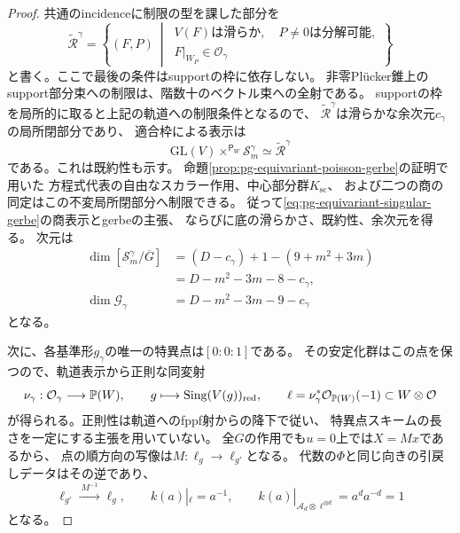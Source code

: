 \begin{proof}
共通のincidenceに制限の型を課した部分を
\begin{equation}
 \widetilde{\mathscr R}^{\gamma}
 =\left\{(F,P)\ \middle|\,
 \begin{gathered}
 V(F)\text{は滑らか},\quad P\ne0\text{は分解可能},\\
 F|_{W_P}\in\mathcal O_\gamma
 \end{gathered}\right\}
 \label{eq:pg-equivariant-singular-incidence}
\end{equation}
と書く。ここで最後の条件はsupportの枠に依存しない。
非零Pl\"ucker錐上のsupport部分束への制限は、階数十のベクトル束への全射である。
supportの枠を局所的に取ると上記の軌道への制限条件となるので、
$\widetilde{\mathscr R}^{\gamma}$は滑らかな余次元$c_\gamma$の局所閉部分であり、
適合枠による表示は
\begin{equation}
 \mathrm{GL}(V)\times^{\mathsf P_W}\mathscr S_m^\gamma
 \simeq\widetilde{\mathscr R}^{\gamma}
 \label{eq:pg-equivariant-singular-associated-incidence}
\end{equation}
である。これは既約性も示す。
命題\ref{prop:pg-equivariant-poisson-gerbe}の証明で用いた
方程式代表の自由なスカラー作用、中心部分群$K_{\mathrm{sc}}$、
および二つの商の同定はこの不変局所閉部分へ制限できる。
従って\eqref{eq:pg-equivariant-singular-gerbe}の商表示とgerbeの主張、
ならびに底の滑らかさ、既約性、余次元を得る。
次元は
\begin{equation}
 \begin{aligned}
 \dim[\mathscr S_m^\gamma/\overline G]
 &=(D-c_\gamma)+1-(9+m^2+3m)\\
 &=D-m^2-3m-8-c_\gamma,\\
 \dim\mathcal G_\gamma
 &=D-m^2-3m-9-c_\gamma
 \end{aligned}
 \label{eq:pg-equivariant-singular-dimension-count}
\end{equation}
となる。

次に、各基準形$g_\gamma$の唯一の特異点は$[0:0:1]$である。
その安定化群はこの点を保つので、軌道表示から正則な同変射
\begin{equation}
 \nu_\gamma:\mathcal O_\gamma\longrightarrow\mathbb P(W),
 \qquad g\longmapsto\operatorname{Sing}(V(g))_{\mathrm{red}},
 \qquad
 \ell=\nu_\gamma^*\mathcal O_{\mathbb P(W)}(-1)\subset W\otimes\mathcal O
 \label{eq:pg-equivariant-singular-point-line}
\end{equation}
が得られる。正則性は軌道へのfppf射からの降下で従い、
特異点スキームの長さを一定にする主張を用いていない。
全$G$の作用でも$u=0$上では$X=Mx$であるから、
点の順方向の写像は$M:\ell_g\to\ell_{g'}$となる。
代数の$\Phi$と同じ向きの引戻しデータはその逆であり、
\begin{equation}
 \ell_{g'}\xrightarrow{\ M^{-1}\ }\ell_g,
 \qquad k(a)|_\ell=a^{-1},
 \qquad k(a)|_{\mathcal A_d\otimes\ell^{\otimes d}}
 =a^d a^{-d}=1
 \label{eq:pg-equivariant-singular-line-weights}
\end{equation}
となる。


\end{proof}
